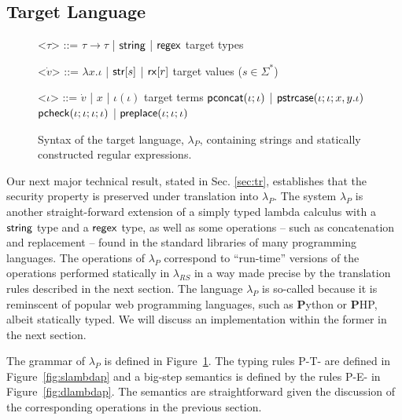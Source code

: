 \documentclass[10pt]{sigplanconf}
\theoremstyle{definition}
\newcommand{\lambdas}{\lambda_{RS}}
\newcommand{\lambdap}{\lambda_P}
\newcommand{\tcheck}[4]{{\sf pcheck}(#1; #2; #3; #4)}
\renewcommand{\tstr}[1]{{{\sf str}[#1]}}
\newcommand{\preplace}[3]{{\sf preplace}(#1;#2;#3)}
\newcommand{\tconcat}[2]{{\sf pconcat}(#1;#2)} \newcommand{\concat}[2]{{\sf concat}(#1;#2)} %
\newcommand{\rx}[1]{ {\sf rx}[#1] }
\newcommand{\str}{{\sf string}}
\newcommand{\regex}{{\sf regex}}
\newcommand{\pstrcase}[3]{ {\sf pstrcase}(#1; #2; #3)}
\begin{document}
\subsection{Target Language}\label{sec:p}
\begin{figure}[t]
\footnotesize
  \begin{grammar}

<$\tau$> ::= $\tau \rightarrow \tau$ | $\str$ | $\regex$ \hfill target types
\vspace{-8px}

<$\dot{v}$> ::= $\lambda x . \iota$ | $\tstr{s}$ | $\rx{r}$ \hfill target values ($s \in \Sigma^{*}$)
\vspace{-8px}

<$\iota$> ::= $\dot{v}$ | $x$ | $\iota(\iota)$ \hfill target terms \alt
   $\tconcat{\iota}{\iota}$ | $\pstrcase{\iota}{\iota}{x,y.\iota}$ \alt
   $\tcheck{\iota}{\iota}{\iota}{\iota}$ | $\preplace{\iota}{\iota}{\iota}$
\end{grammar}
\vspace{-5px}
\caption{Syntax of the target language, $\lambdap$, containing strings and statically constructed regular expressions.}
\label{fig:lcsSyntax}
\end{figure}
Our next major technical result, stated in Sec. \ref{sec:tr}, establishes that the security property
is preserved under translation into $\lambdap$. The system $\lambdap$ is another straight-forward extension of a simply typed lambda calculus
with a $\str$ type and a $\regex$ type, as well as 
some operations -- such as concatenation and replacement -- found in the standard libraries of many programming languages.
The operations of $\lambdap $ correspond to ``run-time'' versions of the operations performed statically in $\lambdas$ in a way made precise by the translation rules described in the next section. 
The language $\lambdap$ is so-called because it is reminscent of popular web programming languages,
such as \textbf{P}ython or \textbf{P}HP, albeit statically typed. We will discuss an implementation within the former in the next section.

The grammar of $\lambdap$ is defined in Figure~\ref{fig:lcsSyntax}.
The typing rules \textsc{P-T-} are defined in Figure~\ref{fig:slambdap}
and a big-step semantics is defined by the rules \textsc{P-E-} in Figure~\ref{fig:dlambdap}. The semantics are straightforward given the discussion of the corresponding operations in the previous section.
\end{document}
